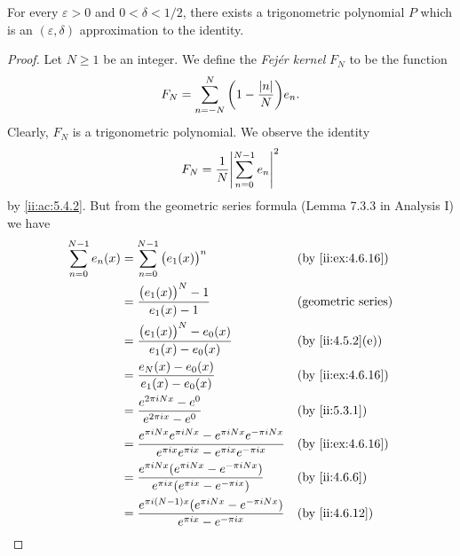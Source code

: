 \begin{lem}\label{ii:5.4.6}
  For every \(\varepsilon > 0\) and \(0 < \delta < 1 / 2\), there exists a trigonometric polynomial \(P\) which is an \((\varepsilon, \delta)\) approximation to the identity.
\end{lem}

\begin{proof}
  Let \(N \geq 1\) be an integer.
  We define the \emph{Fejér kernel} \(F_N\) to be the function
  \[
    F_N = \sum_{n = -N}^N \bigg(1 - \dfrac{\left\lvert n\right\rvert}{N}\bigg) e_n.
  \]
  Clearly, \(F_N\) is a trigonometric polynomial.
  We observe the identity
  \[
    F_N = \dfrac{1}{N} \abs{\sum_{n = 0}^{N - 1} e_n}^2
  \]
  by \cref{ii:ac:5.4.2}.
  But from the geometric series formula (Lemma 7.3.3 in Analysis I) we have
  \begin{align*}
    \sum_{n = 0}^{N - 1} e_n(x) & = \sum_{n = 0}^{N - 1} \big(e_1(x)\big)^n                                                                                &  & \by{ii:ex:4.6.16}         \\
                                & = \dfrac{\big(e_1(x)\big)^N - 1}{e_1(x) - 1}                                                                             &  & \text{(geometric series)} \\
                                & = \dfrac{\big(e_1(x)\big)^N - e_0(x)}{e_1(x) - e_0(x)}                                                                   &  & \by{ii:4.5.2}[e]          \\
                                & = \dfrac{e_N(x) - e_0(x)}{e_1(x) - e_0(x)}                                                                               &  & \by{ii:ex:4.6.16}         \\
                                & = \dfrac{e^{2 \pi i N x} - e^0}{e^{2 \pi i x} - e^0}                                                                     &  & \by{ii:5.3.1}             \\
                                & = \dfrac{e^{\pi i N x} e^{\pi i N x} - e^{\pi i N x} e^{-\pi i N x}}{e^{\pi i x} e^{\pi i x} - e^{\pi i x} e^{-\pi i x}} &  & \by{ii:ex:4.6.16}         \\
                                & = \dfrac{e^{\pi i N x} (e^{\pi i N x} - e^{-\pi i N x})}{e^{\pi i x} (e^{\pi i x} - e^{-\pi i x})}                       &  & \by{ii:4.6.6}             \\
                                & = \dfrac{e^{\pi i (N - 1) x} (e^{\pi i N x} - e^{-\pi i N x})}{e^{\pi i x} - e^{-\pi i x}}                               &  & \by{ii:4.6.12}            \\

\end{align*}
\end{proof}
